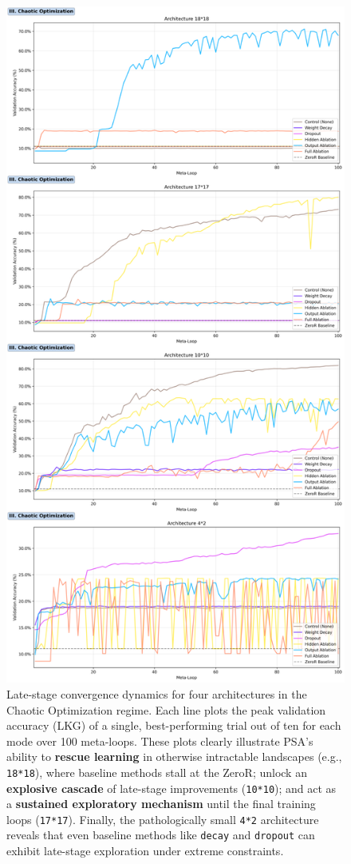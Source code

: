 \documentclass[conference]{IEEEtran}
\begin{document}
\begin{figure}[h]
    \centering
    \includegraphics[width=\columnwidth]{SimpleMLP_Plot_Late_Breakthroughs.png}
    \caption{Late-stage convergence dynamics for four architectures in the Chaotic Optimization regime. Each line plots the peak validation accuracy (LKG) of a single, best-performing trial out of ten for each mode over 100 meta-loops. These plots clearly illustrate PSA's ability to \textbf{rescue learning} in otherwise intractable landscapes (e.g., \texttt{18*18}), where baseline methods stall at the ZeroR; unlock an \textbf{explosive cascade} of late-stage improvements (\texttt{10*10}); and act as a \textbf{sustained exploratory mechanism} until the final training loops (\texttt{17*17}). Finally, the pathologically small \texttt{4*2} architecture reveals that even baseline methods like \texttt{decay} and \texttt{dropout} can exhibit late-stage exploration under extreme constraints.}

\end{figure}
\end{document}
